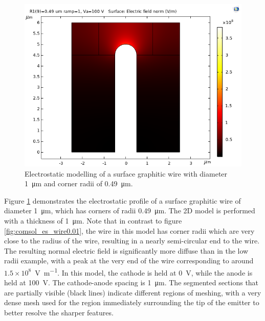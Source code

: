 \begin{refsection}
\begin{figure}[H]
    \centering
    \includegraphics[width=\textwidth]{Chapter7/Figs/Raster/example structure 0.49 normE.png}
    \caption{Electrostatic modelling of a surface graphitic wire with diameter 1~\si{\micro\metre} and corner radii of 0.49~\si{\micro\metre}.}
    \label{fig:comsol_es_wire0.49}
\end{figure}

Figure \ref{fig:comsol_es_wire0.49} demonstrates the electrostatic profile of a surface graphitic wire of diameter 1~\si{\micro\metre}, which has corners of radii 0.49~\si{\micro\metre}. The 2D model is performed with a thickness of 1~\si{\micro\metre}. Note that in contrast to figure \ref{fig:comsol_es_wire0.01}, the wire in this model has corner radii which are very close to the radius of the wire, resulting in a nearly semi-circular end to the wire. The resulting normal electric field is significantly more diffuse than in the low radii example, with a peak at the very end of the wire corresponding to around $1.5\times10^{8}$~\si{\volt\per\metre}. In this model, the cathode is held at 0~\si{\volt}, while the anode is held at 100~\si{\volt}. The cathode-anode spacing is 1~\si{\micro\metre}. The segmented sections that are partially visible (black lines) indicate different regions of meshing, with a very dense mesh used for the region immediately surrounding the tip of the emitter to better resolve the sharper features.


\end{refsection}
